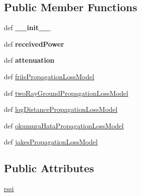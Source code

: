 \subsection*{Public Member Functions}
\begin{DoxyCompactItemize}
\item 
\hypertarget{classmininet_1_1wifiPropagationModels_1_1propagationModel___a6a47183b4f68353e3f22fada5c83e865}{def {\bfseries \-\_\-\-\_\-init\-\_\-\-\_\-}}\label{classmininet_1_1wifiPropagationModels_1_1propagationModel___a6a47183b4f68353e3f22fada5c83e865}

\item 
\hypertarget{classmininet_1_1wifiPropagationModels_1_1propagationModel___ac4ab2767db399b47f5c300c70e23d3d9}{def {\bfseries received\-Power}}\label{classmininet_1_1wifiPropagationModels_1_1propagationModel___ac4ab2767db399b47f5c300c70e23d3d9}

\item 
\hypertarget{classmininet_1_1wifiPropagationModels_1_1propagationModel___ab1eccb9c8767153d701bdbee7577ab23}{def {\bfseries attenuation}}\label{classmininet_1_1wifiPropagationModels_1_1propagationModel___ab1eccb9c8767153d701bdbee7577ab23}

\item 
def \hyperlink{classmininet_1_1wifiPropagationModels_1_1propagationModel___ac116895c706c4d9de59dfe1107b57c20}{friis\-Propagation\-Loss\-Model}
\item 
def \hyperlink{classmininet_1_1wifiPropagationModels_1_1propagationModel___a19fda68ddbddbf56131939aa7758b806}{two\-Ray\-Ground\-Propagation\-Loss\-Model}
\item 
def \hyperlink{classmininet_1_1wifiPropagationModels_1_1propagationModel___a85df966bcab9bb0475294fd71aeb1699}{log\-Distance\-Propagation\-Loss\-Model}
\item 
def \hyperlink{classmininet_1_1wifiPropagationModels_1_1propagationModel___a039a9b90d17295ffb41e116c7ea68e26}{okumura\-Hata\-Propagation\-Loss\-Model}
\item 
def \hyperlink{classmininet_1_1wifiPropagationModels_1_1propagationModel___a0af6ae4dac981d27c89eed916a1a1212}{jakes\-Propagation\-Loss\-Model}
\end{DoxyCompactItemize}
\subsection*{Public Attributes}
\begin{DoxyCompactItemize}
\item 
\hyperlink{classmininet_1_1wifiPropagationModels_1_1propagationModel___a5597e99932232cbe0e9879394c8055a3}{rssi}
\end{DoxyCompactItemize}
